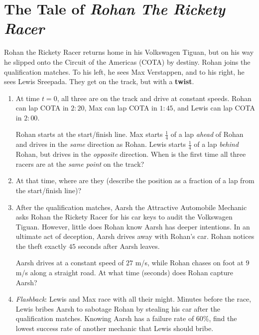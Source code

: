 \documentclass[a4paper]{article}
\begin{document}
    \newpage
    \section*{The Tale of \textit{Rohan The Rickety Racer}}
    
    Rohan the Rickety Racer returns home in his Volkswagen Tiguan, but on his way he slipped onto the Circuit of the Americas (COTA) by destiny. Rohan joins the qualification matches. To his left, he sees Max Verstappen, and to his right, he sees Lewis Sreepada. They get on the track, but with a \textbf{twist}.
    
    
    \begin{enumerate}[itemsep=2.3cm]
    
    \item At time $t=0$, all three are on the track and drive at constant speeds.
    Rohan can lap COTA in $2{:}20$, Max can lap COTA in $1{:}45$, and Lewis can lap COTA in $2{:}00$.
    \vspace{0.3cm}
    
    Rohan starts at the start/finish line. Max starts $\tfrac14$ of a lap \emph{ahead} of Rohan and drives in the \emph{same} direction as Rohan. Lewis starts $\tfrac14$ of a lap \emph{behind} Rohan, but drives in the \emph{opposite} direction. When is the first time all three racers are at the \emph{same point} on the track?
    
    \item At that time, where are they (describe the position as a fraction of a lap from the start/finish line)?

    \item After the qualification matches, Aarsh the Attractive Automobile Mechanic asks Rohan the Rickety Racer for his car keys to audit the Volkswagen Tiguan. However, little does Rohan know Aarsh has deeper intentions. In an ultimate act of deception, Aarsh drives away with Rohan's car. Rohan notices the theft exactly $45$ seconds after Aarsh leaves. 
    \vspace{0.3cm}
    
    Aarsh drives at a constant speed of $27$ m/s, while Rohan chases on foot at $9$ m/s along a straight road. At what time (seconds) does Rohan capture Aarsh?

    \item \textit{Flashback}: Lewis and Max race with all their might. Minutes before the race, Lewis bribes Aarsh to sabotage Rohan by stealing his car after the qualification matches. Knowing Aarsh has a failure rate of 60\%, find the lowest success rate of another mechanic that Lewis should bribe.


\end{enumerate}
\end{document}
